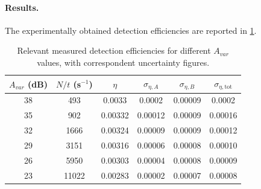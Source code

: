\paragraph{Results.}
The experimentally obtained detection efficiencies are reported in
\cref{tab:experimental_efficiencies}.


\begin{table}[h]
  \centering
  \begin{tabular}{cccccc}
    \toprule
    {\bfseries\boldmath $A_{var}$ (dB)} &
    {\bfseries\boldmath $N/t$ (s$^{-1}$)} &
    {\bfseries\boldmath $\eta$} &
    {\bfseries\boldmath $\sigma_{\eta,A}$} &
    {\bfseries\boldmath $\sigma_{\eta,B}$} &
    {\bfseries\boldmath $\sigma_{\eta,\mathrm{tot}}$} \\
    \midrule
    38 & 493  & 0.0033 & 0.0002 & 0.00009 & 0.0002 \\
    35 & 902  & 0.00332 & 0.00012 & 0.00009 & 0.00016 \\
    32 & 1666 & 0.00324 & 0.00009 & 0.00009 & 0.00012 \\
    29 & 3151 & 0.00316 & 0.00006 & 0.00008 & 0.00010 \\
    26 & 5950 & 0.00303 & 0.00004 & 0.00008 & 0.00009 \\
    23 & 11022 & 0.00283 & 0.00002 & 0.00007 & 0.00008 \\
    \bottomrule
  \end{tabular}
  \caption{Relevant measured detection efficiencies for different
  $A_{var}$ values, with correspondent uncertainty figures. }
  \label{tab:experimental_efficiencies}
\end{table}

